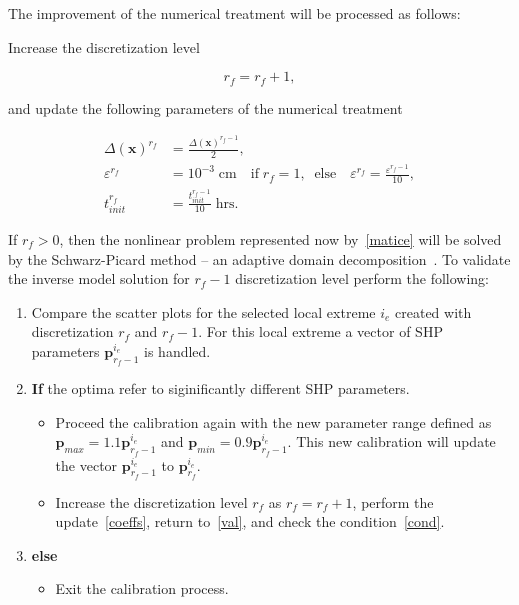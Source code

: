 \documentclass[review]{elsarticle}
\newenvironment{lineq}
    {\begin{linenomath*}
    \begin{equation}
    }
    { 
    \end{equation} 
    \end{linenomath*}
    }
\renewcommand{\vec}{\mathbf}
\newcommand{\subscript}[2]{$#1 _ #2$}
\begin{document}
\begin{enumerate}[label=({\bf \roman*})]
 The improvement of the numerical treatment will be processed as follows:

Increase the discretization level \begin{lineq} r_f=r_f+1,\end{lineq} and update the following parameters of the numerical treatment
\begin{lineq}
\label{coeffs}
\begin{split}
\Delta(\vec{x})^{r_f}  &= \frac{\Delta(\vec{x})^{r_f-1}}{2}, \\
\varepsilon^{r_f} &= 10^{-3} \; \mbox{cm} \quad  \mbox{if} \; r_f = 1, \; \; \mbox{else} \quad \varepsilon^{r_f} = \frac{\varepsilon^{r_f-1}}{10}, \\
t_{init}^{r_f} &=  \frac{t_{init}^{r_f-1}}{10} \; \mbox{hrs} .
\end{split}
\end{lineq}
If $r_f > 0$, then the nonlinear problem represented now by~\eqref{matice} will be solved by the Schwarz-Picard method -- an adaptive domain decomposition~\citep{mojeamc2}. To validate the inverse model solution for $r_f-1$ discretization level perform the following:
  \begin{enumerate}
    \item \label{val} Compare the scatter 
   plots for the selected local extreme $i_e$ created with discretization $r_f$ and $r_f-1$. For this local extreme a vector of SHP parameters $\vec{p}_{r_f-1}^{i_e}$ is handled.  
    \item \label{cond} {\bf If} the optima refer to siginificantly different SHP parameters.  
   \begin{itemize}%
    \item Proceed the calibration  again with the new parameter range defined as $\vec{p}_{max} = 1.1\vec{p}_{r_f-1}^{i_e}$ and  $\vec{p}_{min} = 0.9\vec{p}_{r_f-1}^{i_e}$. This new calibration will update the vector  $\vec{p}_{r_f-1}^{i_e}$ to $\vec{p}_{r_f}^{i_e}$.
    \item \label{ll2} Increase the discretization level $r_f$ as $r_f=r_f+1$, perform the update~\eqref{coeffs}, return to~\ref{val}, and check the condition~\ref{cond}.
    \end{itemize}
    \item {\bf else}
    \begin{itemize}%
    \item Exit the calibration process.
    \end{itemize}
  \end{enumerate}
\end{enumerate}
\end{document}

